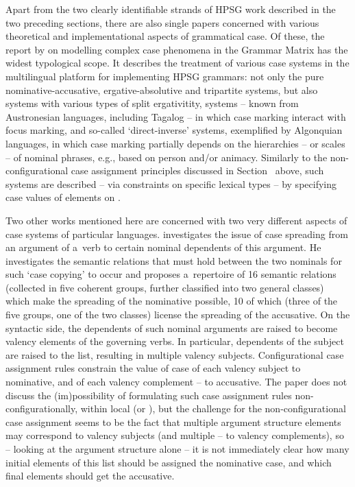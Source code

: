 \documentclass[output=paper]{langsci/langscibook}
\begin{document}
Apart from the two clearly identifiable strands of HPSG work described in the two preceding sections, there are also single papers concerned with various theoretical and implementational aspects of grammatical case.  Of these, the report by \citealt{drel:08} on modelling complex case phenomena in the Grammar Matrix \citep{BFO2002a-u} has the widest typological scope.  It describes the treatment of various case systems in the multilingual platform for implementing HPSG grammars: not only the pure nominative-accusative, ergative-absolutive and tripartite systems, but also systems with various types of split ergativitity, systems – known from Austronesian languages, including Tagalog – in which case marking interact with focus marking, and so-called ‘direct-inverse’ systems, exemplified by Algonquian languages, in which case marking partially depends on the hierarchies – or scales – of nominal phrases, e.g., based on person and/or animacy.  Similarly to the non-configurational case assignment principles discussed in Section~ above, such systems are described – via constraints on specific lexical types – by specifying case values of elements on .

Two other works mentioned here are concerned with two very different aspects of case systems of particular languages.  \citealt{ryu:13} investigates the issue of case spreading from an argument of a~verb to certain nominal dependents of this argument.  He investigates the semantic relations that must hold between the two nominals for such ‘case copying’ to occur and proposes a~repertoire of 16 semantic relations (collected in five coherent groups, further classified into two general classes) which make the spreading of the nominative possible, 10 of which (three of the five groups, one of the two classes) license the spreading of the accusative.  On the syntactic side, the dependents of such nominal arguments are raised to become valency elements of the governing verbs.  In particular, dependents of the subject are raised to the  list, resulting in multiple valency subjects.  Configurational case assignment rules constrain the value of case of each valency subject to nominative, and of each valency complement – to accusative.  The paper does not discuss the (im)possibility of formulating such case assignment rules non-configurationally, within local  (or ), but the challenge for the non-configurational case assignment seems to be the fact that multiple argument structure elements may correspond to valency subjects (and multiple – to valency complements), so – looking at the argument structure alone – it is not immediately clear how many initial elements of this list should be assigned the nominative case, and which final elements should get the accusative.
\end{document}
